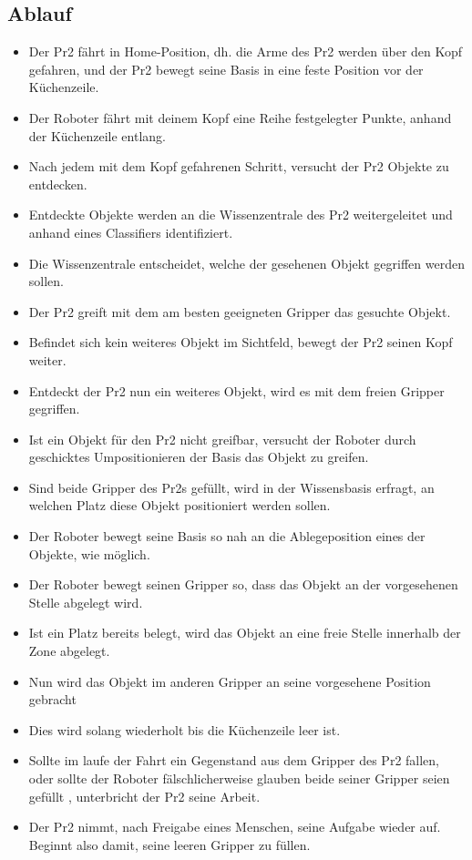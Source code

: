\documentclass{suturo}
\begin{document}
\subsection{Ablauf}
\begin{itemize}
\item Der Pr2 fährt in Home-Position, dh. die Arme des Pr2 werden über den Kopf gefahren, und der Pr2 bewegt seine Basis in eine feste Position vor der Küchenzeile.
\item Der Roboter fährt mit deinem Kopf eine Reihe festgelegter Punkte, anhand der Küchenzeile entlang.
\item Nach jedem mit dem Kopf gefahrenen Schritt, versucht der Pr2 Objekte zu entdecken. 
\item Entdeckte Objekte werden an die Wissenzentrale des Pr2 weitergeleitet und anhand eines Classifiers identifiziert.
\item Die Wissenzentrale entscheidet, welche der gesehenen Objekt gegriffen werden sollen.
\item Der Pr2 greift mit dem am besten geeigneten Gripper das gesuchte Objekt. 
\item Befindet sich kein weiteres Objekt im Sichtfeld, bewegt der Pr2 seinen Kopf weiter. 
\item Entdeckt der Pr2 nun ein weiteres Objekt, wird es mit dem freien Gripper gegriffen.
\item Ist ein Objekt für den Pr2 nicht greifbar, versucht der Roboter durch geschicktes Umpositionieren der Basis das Objekt zu greifen.
\item Sind beide Gripper des Pr2s gefüllt, wird in der Wissensbasis erfragt, an welchen Platz diese Objekt positioniert werden sollen.
\item Der Roboter bewegt seine Basis so nah an die Ablegeposition eines der Objekte, wie möglich.
\item Der Roboter bewegt seinen Gripper so, dass das Objekt an der vorgesehenen Stelle abgelegt wird.
\item Ist ein Platz bereits belegt, wird das Objekt an eine freie Stelle innerhalb der Zone abgelegt.
\item Nun wird das Objekt im anderen Gripper an seine vorgesehene Position gebracht
\item Dies wird solang wiederholt bis die Küchenzeile leer ist.
\item Sollte im laufe der Fahrt ein Gegenstand aus dem Gripper des Pr2 fallen, oder sollte der Roboter fälschlicherweise glauben beide seiner Gripper seien gefüllt , unterbricht der Pr2 seine Arbeit.
\item Der Pr2 nimmt, nach Freigabe eines Menschen, seine Aufgabe wieder auf. Beginnt also damit, seine leeren Gripper zu füllen.
\end{itemize}
\end{document}

